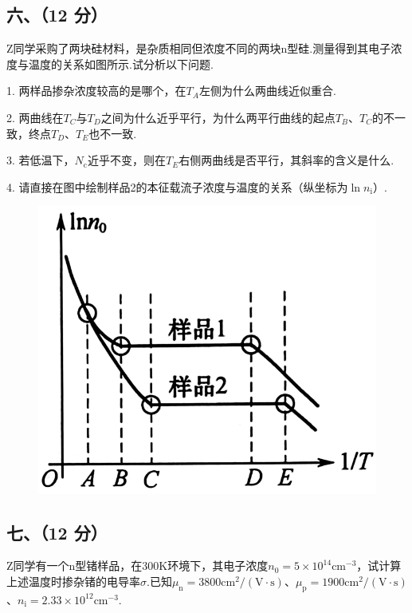 \documentclass{ctexart}
\begin{document}
\subsection*{六、（12 分）}
Z同学采购了两块硅材料，是杂质相同但浓度不同的两块n型硅.测量得到其电子浓度与温度的关系如图所示.试分析以下问题.\par
1. 两样品掺杂浓度较高的是哪个，在$T_A$左侧为什么两曲线近似重合.\par
2. 两曲线在$T_C$与$T_D$之间为什么近乎平行，为什么两平行曲线的起点$T_B$、$T_C$的不一致，终点$T_D$、$T_E$也不一致.\par
3. 若低温下，$N_{\text{c}}$近乎不变，则在$T_E$右侧两曲线是否平行，其斜率的含义是什么.\par
4. 请直接在图中绘制样品2的本征载流子浓度与温度的关系（纵坐标为$\ln n_{\text{i}}$）.
\vspace{-0.2cm}
\begin{figure}[htbp]
    \flushright
    \includegraphics[width=0.4\linewidth]{3.png}
\end{figure}

\vspace{5cm}
\subsection*{七、（12 分）}
Z同学有一个n型锗样品，在300K环境下，其电子浓度$n_0=5\times10^{14}\text{cm}^{-3}$，试计算上述温度时掺杂锗的电导率$\sigma$.已知$\mu_\text{n}=3800 \text{cm}^2/(\text{V}·\text{s})$、$ \mu_\text{p}=1900 \text{cm}^2/(\text{V}·\text{s})$、$ n_\text{i}=2.33×10^{12}\text{cm}^{-3}$.
\end{document}
